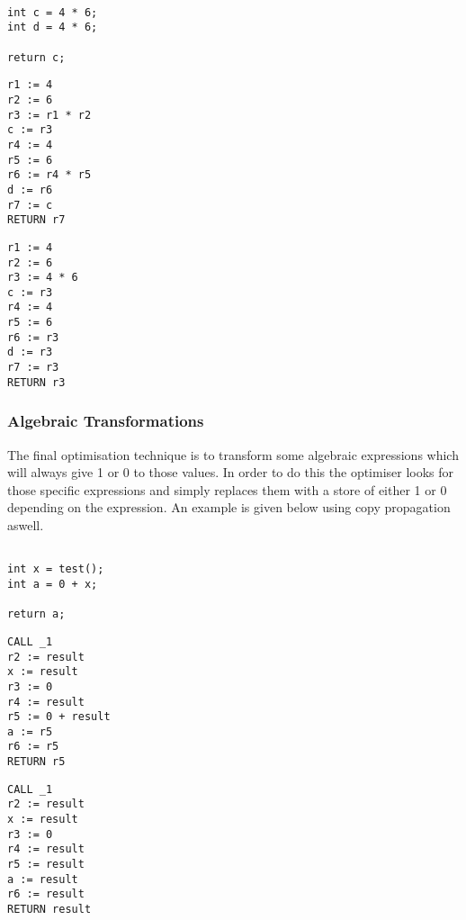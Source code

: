 \documentclass{article}
\begin{document}
\begin{minipage}{0.3\textwidth}
\begin{lstlisting}

int c = 4 * 6;
int d = 4 * 6;

return c;

\end{lstlisting}
\end{minipage}%
\begin{minipage}{0.3\textwidth}
\begin{lstlisting}
r1 := 4
r2 := 6
r3 := r1 * r2
c := r3
r4 := 4
r5 := 6
r6 := r4 * r5
d := r6
r7 := c
RETURN r7
\end{lstlisting}
\end{minipage}%
\begin{minipage}{0.3\textwidth}
\begin{lstlisting}
r1 := 4
r2 := 6
r3 := 4 * 6
c := r3
r4 := 4
r5 := 6
r6 := r3
d := r3
r7 := r3
RETURN r3
\end{lstlisting}
\end{minipage}%

\subsubsection{Algebraic Transformations}

The final optimisation technique is to transform some algebraic expressions
which will always give 1 or 0 to those values. In order to do this the optimiser
looks for those specific expressions and simply replaces them with a store of either
1 or 0 depending on the expression. An example is given below using copy propagation
aswell.

\begin{minipage}{0.3\textwidth}
\begin{lstlisting}

int x = test();
int a = 0 + x;

return a;
\end{lstlisting}
\end{minipage}%
\begin{minipage}{0.3\textwidth}
\begin{lstlisting}
CALL _1
r2 := result
x := result
r3 := 0
r4 := result
r5 := 0 + result
a := r5
r6 := r5
RETURN r5
\end{lstlisting}
\end{minipage}%
\begin{minipage}{0.3\textwidth}
\begin{lstlisting}
CALL _1
r2 := result
x := result
r3 := 0
r4 := result
r5 := result
a := result
r6 := result
RETURN result
\end{lstlisting}
\end{minipage}%
\end{document}
